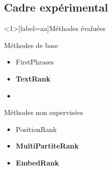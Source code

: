 \subsection{Cadre expérimental}

\begin{frame}<1>[label=aa]{Méthodes évaluées}
    \begin{block}{Méthodes de base}
    \begin{itemize}
        \item FirstPhrases
        \item \textbf<2>{TextRank}~\cite{mihalcea_textrank:_2004}
        \item \textbf<2>{\tfidf{}}~\cite{jones_statistical_1972}
    \end{itemize}
    \end{block}
        
    \begin{block}{Méthodes non supervisées}
    \begin{itemize}
        \item PositionRank~\cite{florescu_positionrank:_2017}
        \item \textbf<3>{MultiPartiteRank}~\cite{boudin_unsupervised_2018}
        \item \textbf<4>{EmbedRank}~\cite{bennani-smires_simple_2018}
    \end{itemize}
    \end{block}
        

\end{frame}
